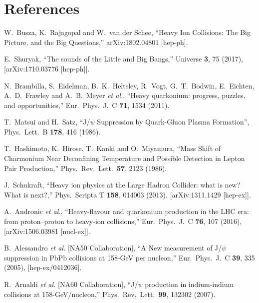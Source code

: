 \documentclass[12pt,a4paper,final]{iopart} %
\begin{document}
\section*{References}
\begin{thebibliography}{100}

  W.~Busza, K.~Rajagopal and W.~van der Schee,
  ``Heavy Ion Collisions: The Big Picture, and the Big Questions,''
  arXiv:1802.04801 [hep-ph].
  

 
  E.~Shuryak,
  ``The sounds of the Little and Big Bangs,''
  Universe {\bf 3}, 75 (2017),
  [arXiv:1710.03776 [hep-ph]].
  

  N.~Brambilla, S.~Eidelman, B.~K.~Heltsley, R.~Vogt, G.~T.~Bodwin, E.~Eichten, A.~D.~Frawley and A.~B.~Meyer {\it et al.},
  ``Heavy quarkonium: progress, puzzles, and opportunities,''
  Eur.\ Phys.\ J.\ C {\bf 71}, 1534 (2011).


 T.~Matsui and H.~Satz,
 ``J/$\psi$ Suppression by Quark-Gluon Plasma Formation'',
 Phys.\ Lett.\ B {\bf 178}, 416 (1986).

  T.~Hashimoto, K.~Hirose, T.~Kanki and O.~Miyamura,
  ``Mass Shift of Charmonium Near Deconfining Temperature and Possible Detection in Lepton Pair Production,''
  Phys.\ Rev.\ Lett.\  {\bf 57}, 2123 (1986).



  J.~Schukraft,
  ``Heavy ion physics at the Large Hadron Collider: what is new? What is next?,''
  Phys.\ Scripta T {\bf 158}, 014003 (2013), [arXiv:1311.1429 [hep-ex]].
  

  A.~Andronic {\it et al.},
  ``Heavy-flavour and quarkonium production in the LHC era: from proton–proton to heavy-ion collisions,''
  Eur.\ Phys.\ J.\ C {\bf 76}, 107 (2016), [arXiv:1506.03981 [nucl-ex]].


  B.~Alessandro {\it et al.} [NA50 Collaboration],
  ``A New measurement of J/$\psi$ suppression in PbPb collisions at 158-GeV per nucleon,''
  Eur.\ Phys.\ J.\ C {\bf 39}, 335 (2005), [hep-ex/0412036].
 
  R.~Arnaldi {\it et al.} [NA60 Collaboration],
  ``J/$\psi$ production in indium-indium collisions at 158-GeV/nucleon,''
  Phys.\ Rev.\ Lett.\ {\bf 99}, 132302 (2007).
  


\end{thebibliography}
\end{document}
